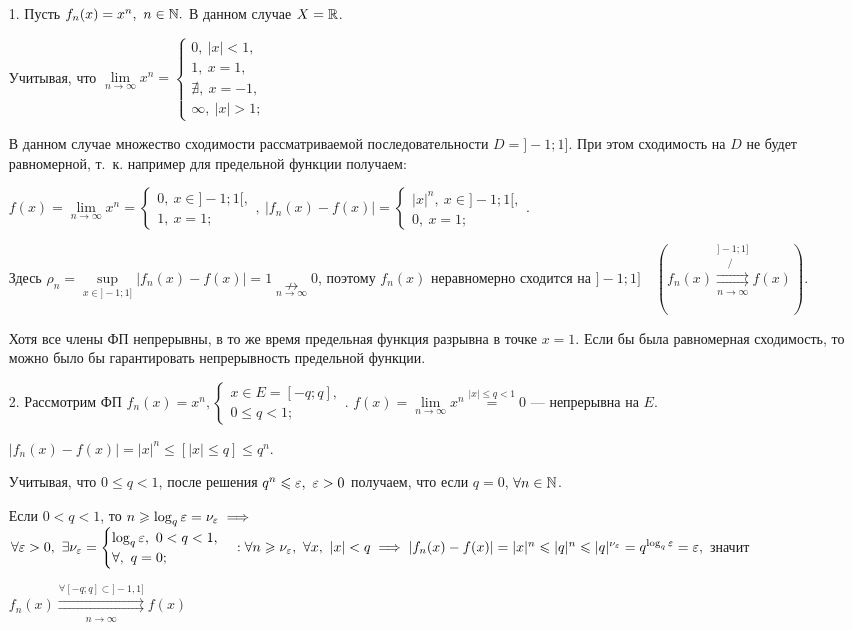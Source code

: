\documentclass[../../main.tex]{subfiles}
\begin{document}
\begin{exmps}
	\;
	\begin{itemize}
		\item[1.] Пусть $f_n(x) = x^n,\ n \in \mathbb{N}.$ 
В данном случае $X = \mathbb{R}$. 

Учитывая, что $\underset{n \to \infty}{\lim} x^n = 
\begin{cases}
0,\ |x| < 1, \\
1,\  x = 1, \\
\nexists,\ x = -1, \\
\infty,\ |x| > 1;
\end{cases}$

В данном случае множество сходимости рассматриваемой 
последовательности $D = ]-1;1]$. 
При этом сходимость на $D$ не будет равномерной, т.~к. 
например для предельной функции получаем:

$f(x) = \underset{n \to \infty}{\lim} x^n = 
\begin{cases}
0,\ x \in ]-1;1[, \\
1,\ x = 1;
\end{cases},\
|f_n(x) - f(x)| = 
\begin{cases}
|x|^n,\ x \in ]-1;1[, \\
0,\ x = 1;
\end{cases}
$.

Здесь $\rho_n = \underset{x \in ]-1;1]}{\sup}|f_n(x)-f(x)| = 1 
\underset{n \to \infty}{\nrightarrow} 0$, поэтому
$f_n(x)$ неравномерно сходится на $]-1;1] \quad
(f_n(x) \overset{]-1;1]}{\underset{n \to \infty}
\not \rightrightarrows} f(x))$. 

Хотя все члены ФП непрерывны, в то же время предельная функция
разрывна в точке $x=1$. Если бы была равномерная сходимость, 
то можно было бы гарантировать непрерывность предельной функции.

		\item[2.] Рассмотрим ФП $f_n(x) = x^n,
\begin{cases}
x \in E = [-q;q], \\
0 \leq q < 1;
\end{cases}.
$
$f(x) = \underset{n \to \infty}{\lim} x^n \overset{|x| \leq q < 1}{=} 0$ ---
непрерывна на $E$.

$|f_n(x) - f(x)| = |x|^n \leq \left[|x| \leq q\right] \leq q^n$.

Учитывая, что $0 \leq q < 1$, после решения 
$q^n \leqslant \varepsilon,\ \varepsilon > 0$ получаем,
что если $q = 0$, $\forall n \in \mathbb{N}$. 

Если $0 < q < 1$, то $n \geqslant \log_q\varepsilon = \nu_\varepsilon \implies$
$\forall \eps > 0,\ \exists \nu_\eps = 
\begin{cases}
\log_q \eps,\ 0 < q < 1, \\
\forall,\ q = 0;
\end{cases} : \forall n \geq \nu_\eps,\ \forall x,\ |x| < q \implies 
|f_n(x) - f(x)| = |x|^n \leq |q|^n \leq |q|^{\nu_\eps} = 
q^{\log_q \eps} = \eps,$ значит

$f_n(x) \overset{\forall [-q;q] \subset ]-1,1]}
{\underset{n \to \infty}\rightrightarrows} f(x)$
	\end{itemize}
\end{exmps}	
\end{document}
